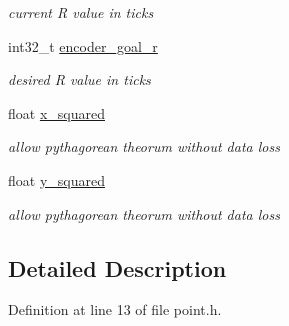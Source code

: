 \begin{DoxyCompactItemize}
\begin{DoxyCompactList}\small\item\em current R value in ticks \end{DoxyCompactList}\item 
\hypertarget{classpoint_ad76d03a1ffcd990690378ebeaf9f135f}{int32\-\_\-t \hyperlink{classpoint_ad76d03a1ffcd990690378ebeaf9f135f}{encoder\-\_\-goal\-\_\-r}}\label{classpoint_ad76d03a1ffcd990690378ebeaf9f135f}

\begin{DoxyCompactList}\small\item\em desired R value in ticks \end{DoxyCompactList}\item 
\hypertarget{classpoint_a79c3aa21753d18cbfe8bafa014e22288}{float \hyperlink{classpoint_a79c3aa21753d18cbfe8bafa014e22288}{x\-\_\-squared}}\label{classpoint_a79c3aa21753d18cbfe8bafa014e22288}

\begin{DoxyCompactList}\small\item\em allow pythagorean theorum without data loss \end{DoxyCompactList}\item 
\hypertarget{classpoint_a72284610ff2d533dec937957508ab8b9}{float \hyperlink{classpoint_a72284610ff2d533dec937957508ab8b9}{y\-\_\-squared}}\label{classpoint_a72284610ff2d533dec937957508ab8b9}

\begin{DoxyCompactList}\small\item\em allow pythagorean theorum without data loss \end{DoxyCompactList}\end{DoxyCompactItemize}


\subsection{Detailed Description}


Definition at line 13 of file point.\-h.



